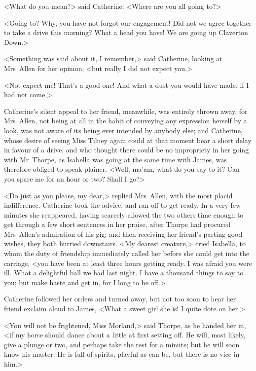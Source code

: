  <What do you mean?> said Catherine. <Where are you all going to?> 

 <Going to? Why, you have not forgot our engagement! Did not we agree together to take a drive this morning? What a head you have! We are going up Claverton Down.> 

 <Something was said about it, I remember,> said Catherine, looking at Mrs~Allen for her opinion; <but really I did not expect you.> 

 <Not expect me! That's a good one! And what a dust you would have made, if I had not come.> 

 Catherine's silent appeal to her friend, meanwhile, was entirely thrown away, for Mrs~Allen, not being at all in the habit of conveying any expression herself by a look, was not aware of its being ever intended by anybody else; and Catherine, whose desire of seeing Miss Tilney again could at that moment bear a short delay in favour of a drive, and who thought there could be no impropriety in her going with Mr~Thorpe, as Isabella was going at the same time with James, was therefore obliged to speak plainer. <Well, ma'am, what do you say to it? Can you spare me for an hour or two? Shall I go?> 

 <Do just as you please, my dear,> replied Mrs~Allen, with the most placid indifference. Catherine took the advice, and ran off to get ready. In a very few minutes she reappeared, having scarcely allowed the two others time enough to get through a few short sentences in her praise, after Thorpe had procured Mrs~Allen's admiration of his gig; and then receiving her friend's parting good wishes, they both hurried downstairs. <My dearest creature,> cried Isabella, to whom the duty of friendship immediately called her before she could get into the carriage, <you have been at least three hours getting ready. I was afraid you were ill. What a delightful ball we had last night. I have a thousand things to say to you; but make haste and get in, for I long to be off.> 

 Catherine followed her orders and turned away, but not too soon to hear her friend exclaim aloud to James, <What a sweet girl she is! I quite dote on her.> 

 <You will not be frightened, Miss Morland,> said Thorpe, as he handed her in, <if my horse should dance about a little at first setting off. He will, most likely, give a plunge or two, and perhaps take the rest for a minute; but he will soon know his master. He is full of spirits, playful as can be, but there is no vice in him.> 

